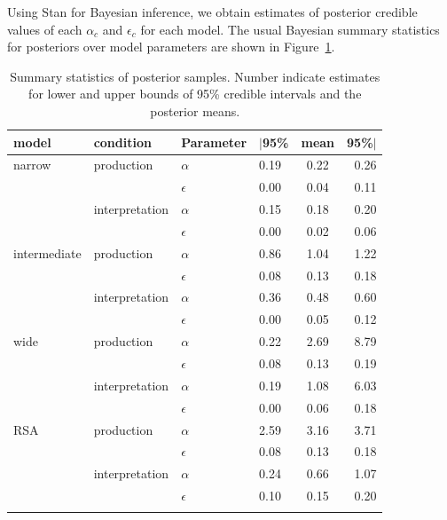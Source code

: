 \documentclass[fleqn]{article}
\begin{document}
Using Stan \citep{Team2023:The-Stan-Core-L} for Bayesian inference, we obtain estimates of posterior credible values of each $\alpha_{c}$ and $\epsilon_{c}$ for each model.
The usual Bayesian summary statistics for posteriors over model parameters are shown in Figure~\ref{fig:posterior-stats}.

\begin{table}[ht]
  \centering


  \begin{tabular}{llllcr}
    \toprule \addlinespace[1ex]
    model        & condition      & Parameter  & $|$95\% & mean & 95\%$|$ \\
    \midrule  \addlinespace[1ex]
    narrow       & production     & $\alpha$   & 0.19    & 0.22 & 0.26 \\
                 &                & $\epsilon$ & 0.00    & 0.04 & 0.11 \\
                 & interpretation & $\alpha$   & 0.15    & 0.18 & 0.20 \\
                 &                & $\epsilon$ & 0.00    & 0.02 & 0.06 \\ \addlinespace[0.75ex]
    intermediate & production     & $\alpha$   & 0.86    & 1.04 & 1.22 \\
                 &                & $\epsilon$ & 0.08    & 0.13 & 0.18 \\
                 & interpretation & $\alpha$   & 0.36    & 0.48 & 0.60 \\
                 &                & $\epsilon$ & 0.00    & 0.05 & 0.12 \\ \addlinespace[0.75ex]
    wide         & production     & $\alpha$   & 0.22    & 2.69 & 8.79 \\
                 &                & $\epsilon$ & 0.08    & 0.13 & 0.19 \\
                 & interpretation & $\alpha$   & 0.19    & 1.08 & 6.03 \\
                 &                & $\epsilon$ & 0.00    & 0.06 & 0.18 \\ \addlinespace[0.75ex]
    RSA          & production     & $\alpha$   & 2.59    & 3.16 & 3.71 \\
                 &                & $\epsilon$ & 0.08    & 0.13 & 0.18 \\
                 & interpretation & $\alpha$   & 0.24    & 0.66 & 1.07 \\
                 &                & $\epsilon$ & 0.10    & 0.15 & 0.20 \\ \addlinespace[0.25ex]
    \bottomrule \\
  \end{tabular}

  \caption{
    Summary statistics of posterior samples.
    Number indicate estimates for lower and upper bounds of 95\% credible intervals and the posterior means.
  }
  \label{fig:posterior-stats}
\end{table}
\end{document}
